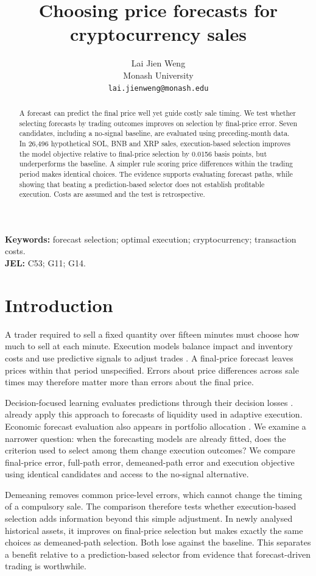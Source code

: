 \documentclass[11pt]{article}
\title{Choosing price forecasts for cryptocurrency sales}
\author{Lai Jien Weng\\Monash University\\\texttt{lai.jienweng@monash.edu}}
\date{}
\begin{document}
\maketitle
\begin{abstract}
A forecast can predict the final price well yet guide costly sale timing. We test whether selecting forecasts by trading outcomes improves on selection by final-price error. Seven candidates, including a no-signal baseline, are evaluated using preceding-month data. In 26,496 hypothetical SOL, BNB and XRP sales, execution-based selection improves the model objective relative to final-price selection by 0.0156 basis points, but underperforms the baseline. A simpler rule scoring price differences within the trading period makes identical choices. The evidence supports evaluating forecast paths, while showing that beating a prediction-based selector does not establish profitable execution. Costs are assumed and the test is retrospective.
\end{abstract}
\noindent\textbf{Keywords:} forecast selection; optimal execution; cryptocurrency; transaction costs.\\
\textbf{JEL:} C53; G11; G14.

\section{Introduction}
A trader required to sell a fixed quantity over fifteen minutes must choose how much to sell at each minute. Execution models balance impact and inventory costs \citep{almgren2001} and use predictive signals to adjust trades \citep{cartea2016,lehalle2019,neuman2022,bank2026}. A final-price forecast leaves prices within that period unspecified. Errors about price differences across sale times may therefore matter more than errors about the final price.

Decision-focused learning evaluates predictions through their decision losses \citep{elmachtoub2022,mandi2024}. \citet{kweon2024} already apply this approach to forecasts of liquidity used in adaptive execution. Economic forecast evaluation also appears in portfolio allocation \citep{maciel2025}. We examine a narrower question: when the forecasting models are already fitted, does the criterion used to select among them change execution outcomes? We compare final-price error, full-path error, demeaned-path error and execution objective using identical candidates and access to the no-signal alternative.

Demeaning removes common price-level errors, which cannot change the timing of a compulsory sale. The comparison therefore tests whether execution-based selection adds information beyond this simple adjustment. In newly analysed historical assets, it improves on final-price selection but makes exactly the same choices as demeaned-path selection. Both lose against the baseline. This separates a benefit relative to a prediction-based selector from evidence that forecast-driven trading is worthwhile.
\end{document}
